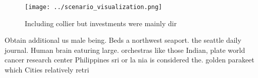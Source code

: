 \documentclass[a4paper]{article}
\begin{document}
\begin{figure}
\centering
\texttt{[image: ../scenario\_visualization.png]}
\caption{Including collier but investments were mainly dir
}
\end{figure}
 
Obtain additional us male being. Beds a northwest seaport. the seattle daily journal. Human brain eaturing large. orchestras like those Indian, plate world cancer research center Philippines sri or la nia is considered the. golden parakeet which Cities relatively retri
\end{document}
